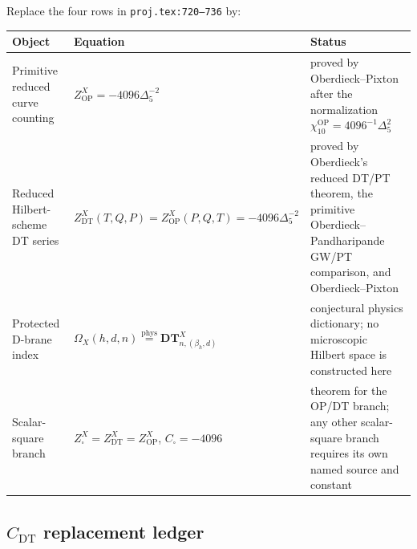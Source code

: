Replace the four rows in \texttt{proj.tex:720--736} by:

\begin{center}
\small
\begin{tabular}{p{}p{}p{}}
\hline
Object & Equation & Status \\
\hline
Primitive reduced curve counting &
\(Z^X_{\mathrm{OP}}=-4096\Delta_5^{-2}\) &
proved by Oberdieck--Pixton after the normalization
\(\chi_{10}^{\mathrm{OP}}=4096^{-1}\Delta_5^2\) \\
Reduced Hilbert-scheme DT series &
\(Z^X_{\mathrm{DT}}(T,Q,P)=Z^X_{\mathrm{OP}}(P,Q,T)
=-4096\Delta_5^{-2}\) &
proved by Oberdieck's reduced DT/PT theorem, the primitive
Oberdieck--Pandharipande GW/PT comparison, and Oberdieck--Pixton \\
Protected D-brane index &
\(\Omega_X(h,d,n)\stackrel{\mathrm{phys}}{=}
\mathbf{DT}^X_{n,(\beta_h,d)}\) &
conjectural physics dictionary; no microscopic Hilbert space is
constructed here \\
Scalar-square branch &
\(Z^X_{\square}=Z^X_{\mathrm{DT}}=Z^X_{\mathrm{OP}}\),
\(C_{\square}=-4096\) &
theorem for the OP/DT branch; any other scalar-square branch requires
its own named source and constant \\
\hline
\end{tabular}
\end{center}

\subsection{\(C_{\mathrm{DT}}\) replacement ledger}

